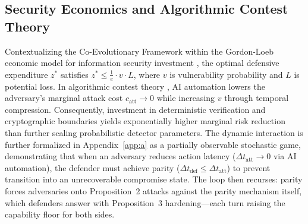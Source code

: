 \documentclass[conference,10pt,twocolumn,a4paper]{IEEEtran}
\begin{document}
\subsection{Security Economics and Algorithmic Contest Theory}
Contextualizing the Co-Evolutionary Framework within the Gordon-Loeb economic model for information security investment \cite{anderson2001why, moore2010economics}, the optimal defensive expenditure $z^*$ satisfies $z^* \le \frac{1}{e} \cdot v \cdot L$, where $v$ is vulnerability probability and $L$ is potential loss. In algorithmic contest theory \cite{alpcan2010network, manshaei2013game}, AI automation lowers the adversary's marginal attack cost $c_{\text{att}} \to 0$ while increasing $v$ through temporal compression. Consequently, investment in deterministic verification and cryptographic boundaries yields exponentially higher marginal risk reduction than further scaling probabilistic detector parameters.
The dynamic interaction is further formalized in Appendix~\ref{app:a} as a partially observable stochastic game, demonstrating that when an adversary reduces action latency ($\Delta t_{\text{att}} \to 0$ via AI automation), the defender must achieve parity ($\Delta t_{\text{def}} \le \Delta t_{\text{att}}$) to prevent transition into an unrecoverable compromise state. The loop then recurses: parity forces adversaries onto Proposition~2 attacks against the parity mechanism itself, which defenders answer with Proposition~3 hardening---each turn raising the capability floor for both sides.
\end{document}
